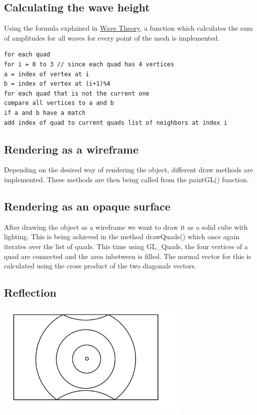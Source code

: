 \documentclass[12pt,a4paper]{scrartcl}
\begin{document}
\subsection{Calculating the wave height}
Using the formula explained in \hyperref[wave-theory]{Wave Theory}, a function  which calculates the sum of amplitudes for all waves for every point of the mesh is implemented.

\begin{lstlisting}[language=PSEUDO]
for each quad
for i = 0 to 3 // since each quad has 4 vertices
a = index of vertex at i
b = index of vertex at (i+1)%4
for each quad that is not the current one
compare all vertices to a and b
if a and b have a match
add index of quad to current quads list of neighbors at index i 
\end{lstlisting}

\subsection{Rendering as a wireframe}
Depending on the desired way of rendering the object, different draw methods are implemented. These methods are then being called from the paintGL() function.

\subsection{Rendering as an opaque surface}
After drawing the object as a wireframe we want to draw it as a solid cube with lighting. This is being achieved in the method drawQuads() which once again iterates over the list of quads. This time using GL_Quads, the four vertices of a quad are connected and the area inbetween is filled. The normal vector for this is calculated using the cross product of the two diagonals vectors.

\subsection{Reflection}

\includegraphics[width=0.7\textwidth]{Images/Reflextion.png}
\end{document}
